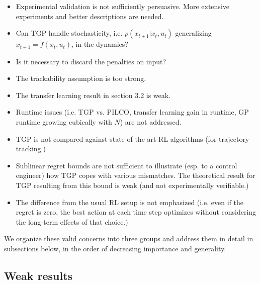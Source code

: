 \documentclass[10pt,a4paper]{article}
\begin{document}
\begin{itemize}
\item Experimental validation is not sufficiently persuasive. More extensive experiments and better descriptions are needed.
\item Can TGP handle stochasticity, i.e. $p(x_{t+1} | x_t, u_t)$ generalizing $x_{t+1} = f(x_t,u_t)$, in the dynamics?
\item Is it necessary to discard the penalties on input?
\item The trackability assumption is too strong. 
\item The transfer learning result in section 3.2 is weak.
\item Runtime issues (i.e. TGP vs. PILCO, transfer learning gain in runtime, GP runtime growing cubically with $N$) are not addressed. 
\item TGP is not compared against state of the art RL algorithms (for trajectory tracking.)
\item Sublinear regret bounds are not sufficient to illustrate (esp. to a control engineer) how TGP copes with various mismatches. The theoretical result for TGP resulting from this bound is weak (and not experimentally verifiable.)
\item The difference from the usual RL setup is not emphasized (i.e. even if the regret is zero, the best action at each time step optimizes without considering the long-term effects of that choice.)
\end{itemize}

We organize these valid concerns into three groups and address them in detail in subsections below, in the order of decreasing importance and generality. \\

\subsection{Weak results}
\end{document}
